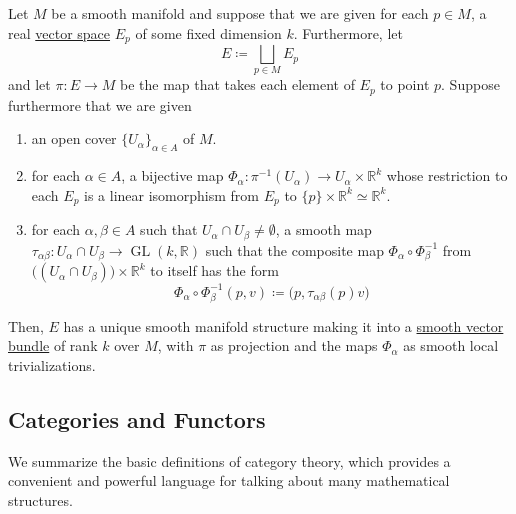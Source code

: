 \documentclass{article}
\DeclareMathOperator{\GL}{GL}
\newcounter{definition}[section]
\begin{document}
  \begin{lemma}
    \label{thm:vector-bundle-construction-lemma}
  Let $M$ be a smooth manifold and suppose that we are given for each $p \in M$, a real \hyperref[lin-def:vector-space]{vector space} $E_p$ of some fixed dimension $k$. Furthermore, let 
  \begin{equation}
    E \coloneqq \bigsqcup_{p \in M} E_p
  \end{equation}
  and let $\pi: E \to M$ be the map that takes each element of $E_p$ to point $p$. Suppose furthermore that we are given
  \begin{enumerate}
      \item an open cover $\{U_\alpha\}_{\alpha \in A}$ of $M$. 
      \item for each $\alpha \in A$, a bijective map $\Phi_\alpha : \pi^{-1} (U_\alpha) \to U_\alpha \times \mathbb{R}^k$ whose restriction to each $E_p$ is a linear isomorphism from $E_p$ to $\{p\} \times \mathbb{R}^k \simeq \mathbb{R}^k$. 
      \item for each $\alpha, \beta \in A$ such that $U_\alpha \cap U_\beta \neq \emptyset$, a smooth map $\tau_{\alpha \beta}: U_\alpha \cap U_\beta \to \GL(k, \mathbb{R})$ such that the composite map $\Phi_\alpha \circ \Phi_\beta^{-1}$ from $\big( (U_\alpha \cap U_\beta)\big) \times \mathbb{R}^k$ to itself has the form 
      \begin{equation}
        \Phi_\alpha \circ \Phi_\beta^{-1} (p, v) \coloneqq \big( p, \tau_{\alpha \beta} (p) v \big)
      \end{equation}
  \end{enumerate}
  Then, $E$ has a unique smooth manifold structure making it into a \hyperref[def:smooth-vector-bundle]{smooth vector bundle} of rank $k$ over $M$, with $\pi$ as projection and the maps $\Phi_\alpha$ as smooth local trivializations. 
  \end{lemma}

  \subsection{Categories and Functors}

    We summarize the basic definitions of category theory, which provides a convenient and powerful language for talking about many mathematical structures. 
\end{document}

